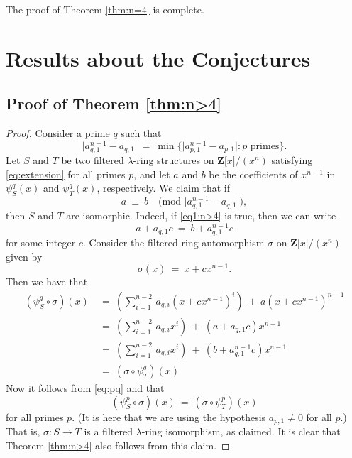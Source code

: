 \documentclass[reqno,11pt]{amsart}
\numberwithin{equation}{subsection}  %
\newcommand{\bZ}{\mathbf{Z}}
\begin{document}
The proof of Theorem \ref{thm:n=4} is complete.




\section{Results about the Conjectures}



\subsection{Proof of Theorem \ref{thm:n>4}}
\begin{proof}
Consider a prime $q$ such that 
   \[
   \vert a_{q,1}^{n-1} - a_{q,1} \vert ~=~ 
   \min\lbrace\vert a_{p,1}^{n-1} - a_{p,1} \vert \colon p \text{ primes}\rbrace.  
   \]
Let $S$ and $T$ be two filtered $\lambda$-ring structures on $\bZ \lbrack x \rbrack/(x^n)$ satisfying \eqref{eq:extension} for all primes $p$, and let $a$ and $b$ be the coefficients of $x^{n-1}$ in $\psi^q_S(x)$ and $\psi^q_T(x)$, respectively.  We claim that if 
   \begin{equation}
   \label{eq1:n>4}
   a ~\equiv~ b \quad \bigl(\text{mod }\vert a_{q,1}^{n-1} - a_{q,1}\vert\bigr),
   \end{equation}
then $S$ and $T$ are isomorphic.  Indeed, if \eqref{eq1:n>4} is true, then we can write
   \begin{equation}
   \label{eq2:n>4}
   a + a_{q,1}c ~=~ b + a_{q,1}^{n-1}c
   \end{equation}
for some integer $c$.  Consider the filtered ring automorphism $\sigma$ on $\bZ \lbrack x \rbrack/(x^n)$ given by 
   \[
   \sigma(x) ~=~ x + cx^{n-1}.
   \]
Then we have that
   \begin{equation}
   \label{eq:pq}
   \begin{split}
   (\psi^q_S \circ \sigma)(x)
   &~=~ \left(\sum_{i=1}^{n-2}\, a_{q,i}(x + cx^{n-1})^i\right) ~+~ a(x + cx^{n-1})^{n-1} \\
   &~=~ \left(\sum_{i=1}^{n-2}\, a_{q,i}x^i\right) ~+~ (a + a_{q,1}c)x^{n-1} \\
   &~=~ \left(\sum_{i=1}^{n-2}\, a_{q,i}x^i\right) ~+~ (b + a_{q,1}^{n-1}c)x^{n-1} \\
   &~=~ (\sigma \circ \psi^q_{T})(x)
   \end{split}
   \end{equation}
Now it follows from \eqref{eq:pq} and \cite[Theorem 4.4]{yau1} that
   \[
   (\psi^p_S \circ \sigma)(x) ~=~ (\sigma \circ \psi^p_T)(x)
   \]
for all primes $p$.  (It is here that we are using the hypothesis $a_{p,1} \not= 0$ for all $p$.)  That is, $\sigma \colon S \to T$ is a filtered $\lambda$-ring isomorphism, as claimed.  It is clear that Theorem \ref{thm:n>4} also follows from this claim.
\end{proof}
\end{document}
